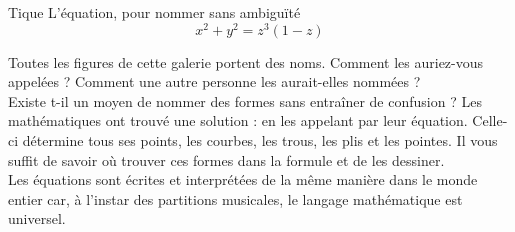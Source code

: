 \begin{surferPage}{Tique}
L'équation, pour nommer sans ambiguïté \\
\smallskip
\[x^2 + y^2	= z^3	(1 - z) \]


\singlespacing
Toutes les figures de cette galerie portent des noms. Comment les auriez-vous appelées ? Comment une autre personne les aurait-elles nommées ?\\
\vspace{0.3cm}
Existe t-il un moyen de nommer des formes sans entraîner de confusion ? Les mathématiques ont trouvé une solution : en les appelant par leur équation. Celle-ci détermine tous ses points, les courbes, les trous, les plis et les pointes. Il vous suffit de savoir où trouver ces formes dans la formule et de les dessiner.\\
\vspace{0.3cm}
Les équations sont écrites et interprétées de la même manière dans le monde entier car, à l'instar des partitions musicales, le langage mathématique est universel.
\end{surferPage}
